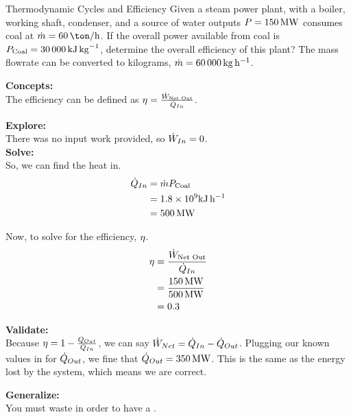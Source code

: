 \begin{example}{Thermodynamic Cycles and Efficiency}
  Given a steam power plant, with a boiler, working shaft, condenser, and a source of water outputs $P = \SI{150}{\mega\watt}$ consumes coal at $\FlowRate{\Mass} = \SI{60}{\ton\per\hour}$.
  If the overall power available from coal is $P_{\text{Coal}} = \SI{30000}{\kilo\joule\per\kilo\gram}$, determine the overall efficiency of this plant?
  \tcblower{}
  The mass flowrate can be converted to kilograms, $\dot{m} = \SI{60000}{\kilo\gram\per\hour}$.

  \textbf{Concepts:} \\
  The efficiency can be defined as $\eta = \frac{\dot{W}_{\text{Net Out}}}{\dot{Q}_{In}}$.

  \textbf{Explore:} \\
  There was no input work provided, so $\dot{W}_{In} = 0$. \\

  \textbf{Solve:} \\
  So, we can find the heat in.
  \begin{align*}
    \dot{Q}_{In} &= \dot{m} P_{\text{Coal}} \\
                          &= 1.8 \times 10^{9}\si{\kilo\joule\per\hour} \\
                          &= \SI{500}{\mega\watt}
  \end{align*}

  Now, to solve for the efficiency, $\eta$.
  \begin{align*}
    \eta &= \frac{\dot{W}_{\text{Net Out}}}{\dot{Q}_{In}} \\
                &= \frac{\SI{150}{\mega\watt}}{\SI{500}{\mega\watt}} \\
                &= 0.3
  \end{align*}

  \textbf{Validate:} \\
  Because $\eta = 1 - \frac{Q_{Out}}{Q_{In}}$, we can say $\dot{W}_{Net} = \dot{Q}_{In} - \dot{Q}_{Out}$.
  Plugging our known values in for $\dot{Q}_{Out}$, we fine that $\dot{Q}_{Out} = \SI{350}{\mega\watt}$.
  This is the same as the energy lost by the system, which means we are correct.

  \textbf{Generalize:} \\
  You must waste  in order to have a .
\end{example}

